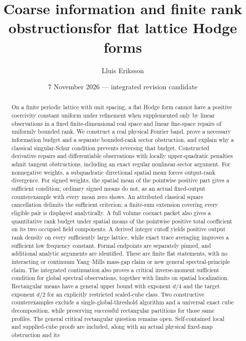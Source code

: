 \documentclass[11pt]{article}
\title{Coarse information and finite rank obstructions\newline for flat lattice Hodge forms}
\author{Lluis Eriksson}
\date{7 November 2026 --- integrated revision candidate}
\begin{document}
\maketitle
\begin{abstract}
On a finite periodic lattice with unit spacing, a flat Hodge form cannot
have a positive coercivity constant uniform under refinement when supplemented
only by linear observations in a fixed finite-dimensional real space and
linear fine-space repairs of uniformly bounded rank. We construct a real
physical Fourier band, prove a necessary information budget and a separate
bounded-rank sector obstruction, and explain why a classical singular-Schur
condition prevents reversing that budget. Constructed derivative repairs
and differentiable observations with locally upper-quadratic penalties
admit tangent obstructions, including an exact regular nonlinear-sector
argument. For nonnegative weights, a subquadratic directional spatial mean
forces output-rank divergence. For signed weights, the spatial mean of the
pointwise positive part gives a sufficient condition; ordinary signed means
do not, as an actual fixed-output counterexample with every mean zero shows.
An attributed classical square cancellation delimits the sufficient criterion;
a finite-sum extension covering every eligible pair is displayed analytically.
A full volume coexact packet also gives a quantitative rank budget under
spatial means of the pointwise positive total coefficient on its two occupied
field components. A derived integer cutoff yields positive output rank density
on every sufficiently large lattice, while exact trace averaging improves a
sufficient low frequency constant. Formal endpoints are separately pinned, and additional analytic arguments
are identified. These are finite flat statements, with no interacting or
continuum Yang--Mills mass-gap claim or new general spectral-principle claim.
The integrated continuation also proves a critical inverse-moment sufficient
condition for global spectral observations, together with limits on spatial
localization. Rectangular means have a general upper bound with exponent
$d/4$ and the target exponent $d/2$ for an explicitly restricted scaled-cube
class. Two constructive counterexamples exclude a single-global-threshold
algorithm and a universal exact cube decomposition, while preserving successful
rectangular partitions for those same profiles. The general critical
rectangular question remains open. Self-contained local and supplied-cube proofs
are included, along with an actual physical fixed-map obstruction and its

\end{abstract}
\end{document}
